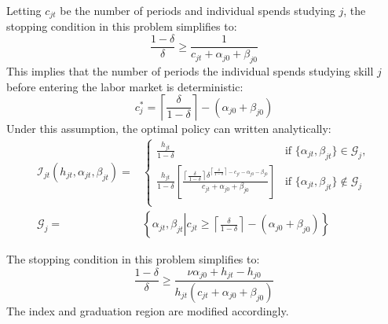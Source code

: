 \documentclass[10 pt]{article}
\newcommand{\sbr}[1]{\left[ #1 \right]}
\begin{document}
\begin{outline}



Letting $c_{jt}$ be the number of periods and individual spends studying $j$, the stopping condition in this problem simplifies to:
\begin{equation*}
	\frac{1- \delta}{\delta} \geq \frac{1}{c_{jt} + \alpha_{j0} + \beta_{j0}}
\end{equation*}
This implies that the number of periods the individual spends studying skill $j$ before entering the labor market is deterministic: 
\begin{equation}\label{bb-mj}
	c_j^* = \left\lceil \frac{\delta}{1 - \delta} \right\rceil - (\alpha_{j0} + \beta_{j0})
\end{equation}
Under this assumption, the optimal policy can written analytically:
\begin{align*}
\mathcal{I}_{jt} (h_{jt}, \alpha_{jt}, \beta_{jt}) = &
\begin{cases}
\frac{h_{jt}}{1 - \delta} & \text{if } \{\alpha_{jt}, \beta_{jt}\} \in \mathcal{G}_{j}, \\
\frac{h_{jt}}{1 - \delta} \sbr{
   \frac{
      \left\lceil \frac{\delta}{1 - \delta} \right\rceil
      \delta^{\left\lceil \frac{\delta}{1 - \delta} \right\rceil - c_{jt} - \alpha_{j0} - \beta_{j0}}}
   {c_{jt} + \alpha_{j0} + \beta_{j0}}
   } & \text{if } \{\alpha_{jt}, \beta_{jt}\} \notin \mathcal{G}_{j} \\
\end{cases} \\
   \mathcal{G}_j = & \left\{ \alpha_{jt}, \beta_{jt} \left\vert c_{jt} \geq \left\lceil \frac{\delta}{1 - \delta} \right\rceil - (\alpha_{j0} + \beta_{j0}) \right. \right\}
\end{align*}



The stopping condition in this problem simplifies to:
\begin{equation}\label{stop}
	\frac{1- \delta}{\delta} \geq 
	\frac{\nu \alpha_{j0} + h_{jt} - h_{j0}}{h_{jt}(c_{jt} + \alpha_{j0} + \beta_{j0})}
\end{equation}
The index and graduation region are modified accordingly. 

\end{outline}
\end{document}
